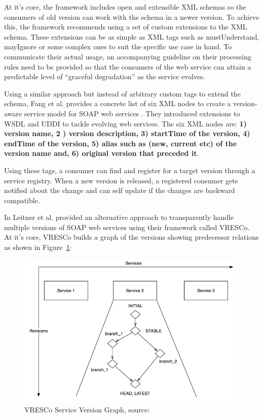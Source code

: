 \documentclass[runningheads,a4paper]{llncs}
\begin{document}
At it’s core, the framework includes open and extensible XML schemas so the consumers of old version can work with the schema in a newer version. To achieve this, the framework recommends using a set of custom extensions to the XML schema. These extensions can be as simple as XML tags such as mustUnderstand, mayIgnore or some complex ones to suit the specific use case in hand. To communicate their actual usage, an accompanying guideline on their processing rules need to be provided so that the consumers of the web service can attain a predictable level of ``graceful degradation'' as the service evolves.

Using a similar approach but instead of arbitrary custom tags to extend the schema, Fang et al. provides a concrete list of six XML nodes to create a version-aware service model for SOAP web services \cite{fang2007version}. They introduced extensions to WSDL and UDDI \cite{uddi_wiki} to tackle evolving web services. The six XML nodes are: \textbf{1) version name, 2 ) version description, 3) startTime of the version, 4) endTime of the version, 5) alias such as (new, current etc) of the version name and, 6) original version that preceded it}.

Using these tags, a consumer can find and register for a target version through a service registry. When a new version is released, a registered consumer gets notified about the change and can self update if the changes are backward compatible.

In \cite{leitner2008end} Leitner et al. provided an alternative approach to transparently handle multiple versions of SOAP web services using their framework called VRESCo. At it’s core, VRESCo builds a graph of the versions showing predecessor relations as shown in Figure~\ref{fig:vresco}:

\begin{figure}[bt]
  \centering
  \includegraphics[scale=0.35]{vresco.png}
    \caption{VRESCo Service Version Graph, source: \cite{leitner2008end}}
  \label{fig:vresco}
\end{figure}
\end{document}
